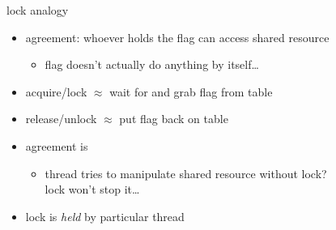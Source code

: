 \begin{frame}{lock analogy}
    \begin{itemize}
    \item agreement: whoever holds the flag can access shared resource
        \begin{itemize}
        \item flag doesn't actually do anything by itself\ldots
        \end{itemize}
    \item acquire/lock $\approx$ wait for and grab flag from table
    \item release/unlock $\approx$ put flag back on table
    \vspace{.5cm}
    \item<2-> agreement is 
        \begin{itemize}
        \item thread tries to manipulate shared resource without lock? \\
            lock won't stop it\ldots
        \end{itemize}
    \item<2-> lock is \textit{held} by particular thread
    \end{itemize}
\end{frame}
